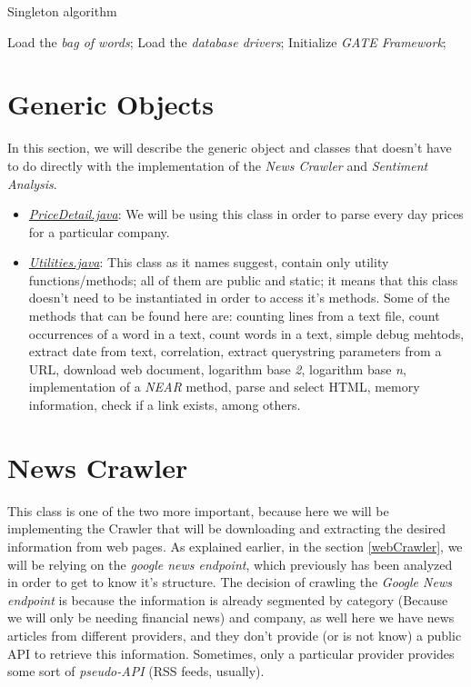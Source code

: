 \begin{algorithm}
\caption{Singleton algorithm}\label{singletonAlgorithm}
\begin{algorithmic}[1]

		\STATE Load the \emph{bag of words};
		\STATE Load the \emph{database drivers};
		\STATE Initialize \emph{GATE Framework};
\ENDIF
\end{algorithmic}
\end{algorithm}

\section{Generic Objects}

In this section, we will describe the generic object and classes that doesn't have to do directly with the implementation of the \emph{News Crawler} and \emph{Sentiment Analysis}.

\begin{itemize}
	\item \emph{\ul{PriceDetail.java}}: We will be using this class in order to parse every day prices for a particular company.
	\item \emph{\ul{Utilities.java}}: This class as it names suggest, contain only utility functions/methods; all of them are public and static; it means that this class doesn't need to be instantiated in order to access it's methods. Some of the methods that can be found here are: counting lines from a text file, count occurrences of a word in a text, count words in a text, simple debug mehtods, extract date from text, correlation, extract querystring parameters from a URL, download web document, logarithm base \emph{2}, logarithm base \emph{n}, implementation of a \emph{NEAR} method, parse and select HTML, memory information, check if a link exists, among others.
\end{itemize}

\section{News Crawler}

This class is one of the two more important, because here we will be implementing the Crawler that will be downloading and extracting the desired information from web pages. As explained earlier, in the section \ref{webCrawler}, we will be relying on the \emph{google news endpoint}, which previously has been analyzed in order to get to know it's structure. The decision of crawling the \emph{Google News endpoint} is because the information is already segmented by category (Because we will only be needing financial news) and company, as well here we have news articles from different providers, and they don't provide (or is not know) a public API to retrieve this information. Sometimes, only a particular provider provides some sort of \emph{pseudo-API} (RSS feeds, usually).

